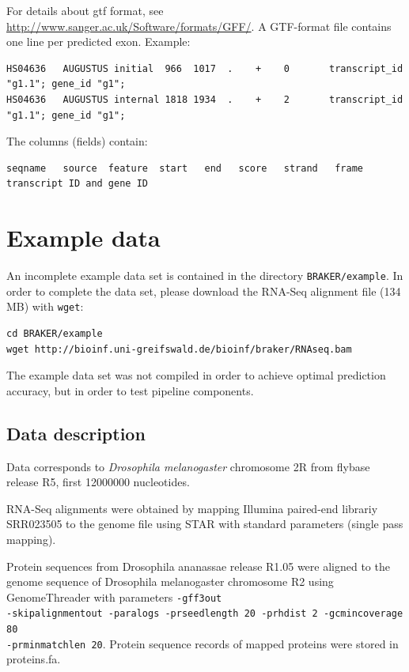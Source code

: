 \documentclass[a4paper,10pt]{report}
\begin{document}
For details about gtf format, see \url{http://www.sanger.ac.uk/Software/formats/GFF/}. A GTF-format file
contains one line per predicted exon. Example:

\begin{verbatim}
HS04636   AUGUSTUS initial  966  1017  .    +    0       transcript_id "g1.1"; gene_id "g1";
HS04636   AUGUSTUS internal 1818 1934  .    +    2       transcript_id "g1.1"; gene_id "g1";
\end{verbatim}

The columns (fields) contain: 

\begin{verbatim}
seqname   source  feature  start   end   score   strand   frame  transcript ID and gene ID
\end{verbatim}


\chapter{Example data}

An incomplete example data set is contained in the directory \texttt{BRAKER/example}. In order to complete the data set, please download the RNA-Seq alignment file (134 MB) with \texttt{wget}:

\begin{verbatim}
cd BRAKER/example
wget http://bioinf.uni-greifswald.de/bioinf/braker/RNAseq.bam
\end{verbatim}

The example data set was not compiled in order to achieve optimal prediction accuracy, but in order to test pipeline components.

\section{Data description}

Data corresponds to \textit{Drosophila melanogaster} chromosome 2R from flybase release R5, first 12000000 nucleotides.

RNA-Seq alignments were obtained by mapping Illumina paired-end librariy SRR023505 to the genome file using STAR with standard parameters (single pass mapping).

Protein sequences from Drosophila ananassae release R1.05 were aligned to the genome sequence of
Drosophila melanogaster chromosome R2 using GenomeThreader with parameters
\texttt{-gff3out \\-skipalignmentout -paralogs -prseedlength 20 -prhdist 2 -gcmincoverage 80 \\
-prminmatchlen 20}.
Protein sequence records of mapped proteins were stored in proteins.fa. 
\end{document}
